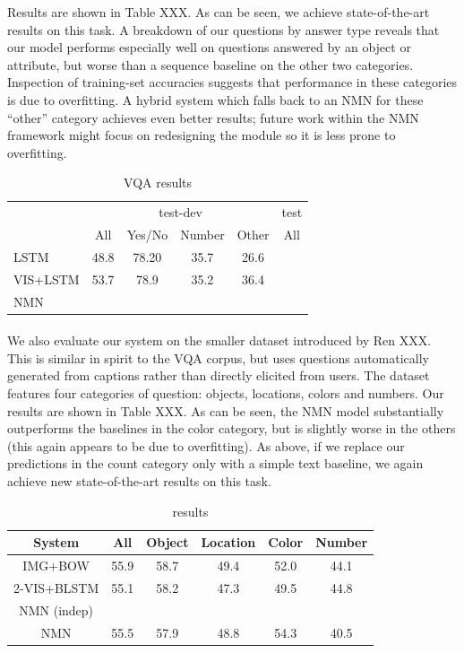 \documentclass[10pt,twocolumn,letterpaper]{article}
\begin{document}
Results are shown in Table XXX. As can be seen, we achieve state-of-the-art
results on this task. A breakdown of our questions by answer type reveals that
our model performs especially well on questions answered by an object or
attribute, but worse than a sequence baseline on the other two categories.
Inspection of training-set accuracies suggests that performance in these
categories is due to overfitting. A hybrid system which falls back to an NMN
for these ``other'' category achieves even better results; future work within
the NMN framework might focus on redesigning the  module
so it is less prone to overfitting.

\begin{table}
  \footnotesize
  \center
  \begin{tabular}{lccccc}
    \toprule
    & \multicolumn{4}{c}{test-dev} & test \\
    \cmidrule(lr){2-5} \cmidrule(lr){6-6}
    & All & Yes/No & Number & Other & All \\
    \midrule
    LSTM & 48.8 & 78.20 & 35.7 & 26.6 \\
    VIS+LSTM & 53.7 & 78.9 & 35.2 & 36.4 & \\
    NMN & \\
    \bottomrule
  \end{tabular}
  \caption{VQA results}
\end{table}

\paragraph{\cocoqa}
We also evaluate our system on the smaller \cocoqa dataset introduced by Ren
XXX. This is similar in spirit to the VQA corpus, but uses questions
automatically generated from captions rather than directly elicited from users.
The \cocoqa dataset features four categories of question: objects, locations,
colors and numbers. Our results are shown in Table XXX. As can be seen, the NMN
model substantially outperforms the baselines in the color category, but is
slightly worse in the others (this again appears to be due to overfitting). As
above, if we replace our predictions in the count category only with a simple
text baseline, we again achieve new state-of-the-art results on this task.

\begin{table}
  \footnotesize
  \center
  \begin{tabular}{cccccc}
    \toprule
    System & All & Object & Location & Color & Number \\
    \midrule
    IMG+BOW & 55.9 & 58.7 & 49.4 & 52.0 & 44.1 \\
    2-VIS+BLSTM & 55.1 & 58.2 & 47.3 & 49.5 & 44.8 \\
    NMN (indep) \\
    NMN & 55.5 & 57.9 & 48.8 & 54.3 & 40.5 \\
    \bottomrule
  \end{tabular}
  \caption{\cocoqa results}
\end{table}
\end{document}
